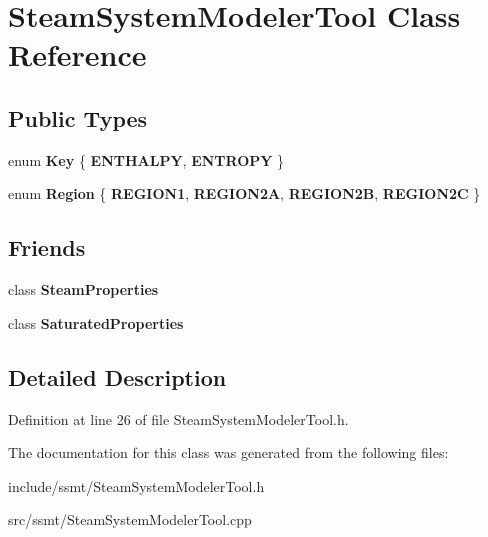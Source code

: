 \hypertarget{class_steam_system_modeler_tool}{}\section{Steam\+System\+Modeler\+Tool Class Reference}
\label{class_steam_system_modeler_tool}
\subsection*{Public Types}
\begin{DoxyCompactItemize}
\item 
\mbox{\label{class_steam_system_modeler_tool_aed38516c350ca4ecf17b545e07d41dcd}} 
enum {\bfseries Key} \{ {\bfseries E\+N\+T\+H\+A\+L\+PY}, 
{\bfseries E\+N\+T\+R\+O\+PY}
 \}
\item 
\mbox{\label{class_steam_system_modeler_tool_a162eeadc7eb56a9b50b7a8f630eb8f05}} 
enum {\bfseries Region} \{ {\bfseries R\+E\+G\+I\+O\+N1}, 
{\bfseries R\+E\+G\+I\+O\+N2A}, 
{\bfseries R\+E\+G\+I\+O\+N2B}, 
{\bfseries R\+E\+G\+I\+O\+N2C}
 \}
\end{DoxyCompactItemize}
\subsection*{Friends}
\begin{DoxyCompactItemize}
\item 
\mbox{\label{class_steam_system_modeler_tool_a7b6c56e04b76b2d946235064998e84c9}} 
class {\bfseries Steam\+Properties}
\item 
\mbox{\label{class_steam_system_modeler_tool_a43a03ec32145468365cf841d9310263c}} 
class {\bfseries Saturated\+Properties}
\end{DoxyCompactItemize}


\subsection{Detailed Description}


Definition at line 26 of file Steam\+System\+Modeler\+Tool.\+h.



The documentation for this class was generated from the following files\+:\begin{DoxyCompactItemize}
\item 
include/ssmt/Steam\+System\+Modeler\+Tool.\+h\item 
src/ssmt/Steam\+System\+Modeler\+Tool.\+cpp\end{DoxyCompactItemize}
